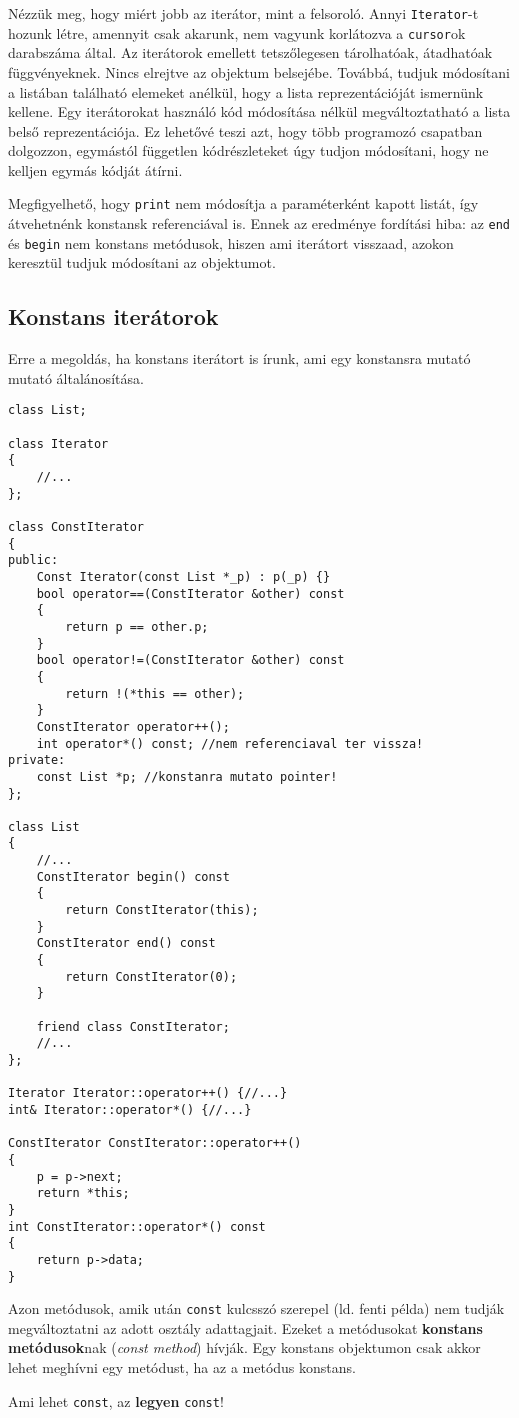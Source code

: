 \documentclass[a4paper,11.5pt,table]{article}
\begin{document}
	\medskip
	Nézzük meg, hogy miért jobb az iterátor, mint a felsoroló. Annyi \texttt{Iterator}-t hozunk létre, amennyit csak akarunk, nem vagyunk korlátozva a \texttt{cursor}ok darabszáma által. Az iterátorok emellett tetszőlegesen tárolhatóak, átadhatóak függvényeknek. Nincs elrejtve az objektum belsejébe. Továbbá, tudjuk módosítani a listában található elemeket anélkül, hogy a lista reprezentációját ismernünk kellene. Egy iterátorokat használó kód módosítása nélkül megváltoztatható a lista belső reprezentációja. Ez lehetővé teszi azt, hogy több programozó csapatban dolgozzon, egymástól független kódrészleteket úgy tudjon módosítani, hogy ne kelljen egymás kódját átírni.
	
	\medskip
	Megfigyelhető, hogy \texttt{print} nem módosítja a paraméterként kapott listát, így átvehetnénk konstansk referenciával is. Ennek az eredménye fordítási hiba: az \texttt{end} és \texttt{begin} nem konstans metódusok, hiszen ami iterátort visszaad, azokon keresztül tudjuk módosítani az objektumot.
	\subsection{Konstans iterátorok}
	Erre a megoldás, ha konstans iterátort is írunk, ami egy konstansra mutató mutató általánosítása.
\begin{lstlisting}
class List;

class Iterator
{
	//...
};

class ConstIterator
{
public:
	Const Iterator(const List *_p) : p(_p) {}
	bool operator==(ConstIterator &other) const
	{
		return p == other.p;
	}
	bool operator!=(ConstIterator &other) const
	{
		return !(*this == other);
	}
	ConstIterator operator++();
	int operator*() const; //nem referenciaval ter vissza!
private:
	const List *p; //konstanra mutato pointer!
};

class List
{
	//...
	ConstIterator begin() const
	{
		return ConstIterator(this);	
	}
	ConstIterator end() const
	{
		return ConstIterator(0);	
	}
	
	friend class ConstIterator;
	//...
};

Iterator Iterator::operator++() {//...}
int& Iterator::operator*() {//...}

ConstIterator ConstIterator::operator++()
{
	p = p->next;
	return *this;
}
int ConstIterator::operator*() const
{
	return p->data;
}
\end{lstlisting}
	Azon metódusok, amik után \texttt{const} kulcsszó szerepel (ld. fenti példa) nem tudják megváltoztatni az adott osztály adattagjait. Ezeket a metódusokat \textbf{konstans metódusok}nak (\textit{const method}) hívják. Egy konstans objektumon csak akkor lehet meghívni egy metódust, ha az a metódus konstans.
	\begin{note}
		Ami lehet \texttt{const}, az \textbf{legyen} \texttt{const}!
	\end{note}
\end{document}
